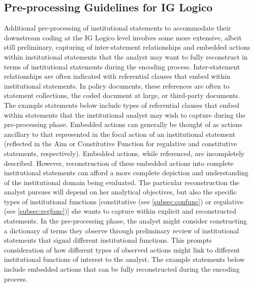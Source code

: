 \subsection{Pre-processing Guidelines for IG Logico} %

Additional pre-processing of institutional statements to accommodate their downstream coding at the IG Logico level involves some more extensive, albeit still preliminary, capturing of inter-statement relationships and embedded actions within institutional statements that the analyst may want to fully reconstruct in terms of institutional statements during the encoding process. Inter-statement relationships are often indicated with referential clauses that embed within institutional statements. In policy documents, these references are often to statement collections, the coded document at large, or third-party documents. The example statements below include types of referential clauses that embed within statements that the institutional analyst may wish to capture during the pre-processing phase. Embedded actions can generally be thought of as actions ancillary to that represented in the focal action of an institutional statement (reflected in the Aim or Constitutive Function for regulative and constitutive statements, respectively). Embedded actions, while referenced, are incompletely described. However, reconstruction of these embedded actions into complete institutional statements can afford a more complete depiction and understanding of the institutional domain being evaluated. The particular reconstruction the analyst pursues will depend on her analytical objectives, but also the specific types of institutional functions [constitutive (see \cref{subsec:confunc}) or regulative (see \cref{subsec:regfunc})] she wants to capture within explicit and reconstructed statements. In the pre-processing phase, the analyst might consider constructing a dictionary of terms they observe through preliminary review of institutional statements that signal different institutional functions. This prompts consideration of how different types of observed actions might link to different institutional functions of interest to the analyst. The example statements below include embedded actions that can be fully reconstructed during the encoding process. 

\sp

